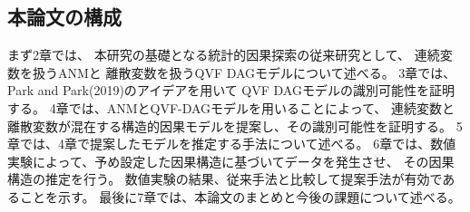 
\subsection{本論文の構成}

まず2章では、
本研究の基礎となる統計的因果探索の従来研究として、
連続変数を扱うANMと
離散変数を扱うQVF DAGモデルについて述べる。
3章では、Park and Park(2019)\cite{Park2019-qy}のアイデアを用いて
QVF DAGモデルの識別可能性を証明する。
4章では、ANMとQVF-DAGモデルを用いることによって、
連続変数と離散変数が混在する構造的因果モデルを提案し、その識別可能性を証明する。
5章では、4章で提案したモデルを推定する手法について述べる。
6章では、数値実験によって、予め設定した因果構造に基づいてデータを発生させ、
その因果構造の推定を行う。
数値実験の結果、従来手法と比較して提案手法が有効であることを示す。
最後に7章では、本論文のまとめと今後の課題について述べる。
